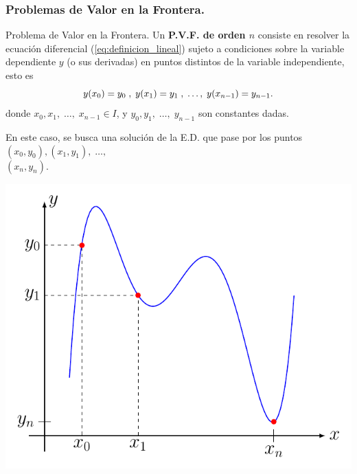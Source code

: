 \documentclass{beamer}
\begin{document}
\begin{frame}[t]
	\frametitle{Problemas de Valor en la Frontera.}
	\begin{block}{Problema de Valor en la Frontera.}
		Un \textbf{P.V.F. de orden \(n\)} consiste en resolver la ecuación diferencial (\ref{eq:definicion_lineal}) sujeto a condiciones sobre la variable dependiente \(y\) (o sus derivadas) en puntos distintos de la variable independiente, esto es
		\[
			y(x_0) =y_0 \;,\;  y(x_1) =y_1 \;, \;\ldots,\; y(x_{n-1}) =y_{n-1}. \vspace{-2.5mm}
		\]
		donde \(x_0,x_1, \;\ldots,\; x_{n-1} \in I\), y \(y_0,y_1, \;\ldots,\; y_{n-1}\) son constantes dadas.\\[-5.5mm]
		\begin{minipage}{0.3\linewidth}
			En este caso, se busca una solución de la E.D. que pase por los puntos \((x_0,y_0) , (x_1,y_1) , \;\ldots,\)\\\( (x_n,y_n)\).
		\end{minipage} \hspace{5mm}
		\begin{minipage}{0.6\linewidth}
			\includegraphics[width= 0.9\linewidth]{IMAGENES/3/tikz.pdf}
		\end{minipage}
	\end{block}
\end{frame}
\end{document}
